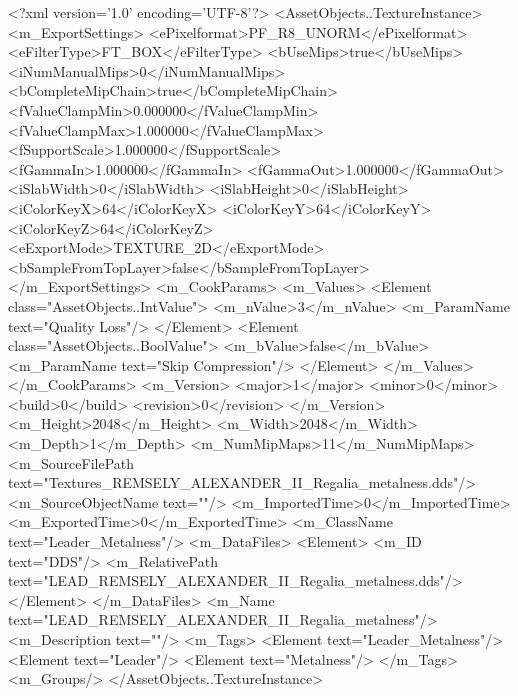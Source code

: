 <?xml version='1.0' encoding='UTF-8'?>
<AssetObjects..TextureInstance>
  <m_ExportSettings>
    <ePixelformat>PF_R8_UNORM</ePixelformat>
    <eFilterType>FT_BOX</eFilterType>
    <bUseMips>true</bUseMips>
    <iNumManualMips>0</iNumManualMips>
    <bCompleteMipChain>true</bCompleteMipChain>
    <fValueClampMin>0.000000</fValueClampMin>
    <fValueClampMax>1.000000</fValueClampMax>
    <fSupportScale>1.000000</fSupportScale>
    <fGammaIn>1.000000</fGammaIn>
    <fGammaOut>1.000000</fGammaOut>
    <iSlabWidth>0</iSlabWidth>
    <iSlabHeight>0</iSlabHeight>
    <iColorKeyX>64</iColorKeyX>
    <iColorKeyY>64</iColorKeyY>
    <iColorKeyZ>64</iColorKeyZ>
    <eExportMode>TEXTURE_2D</eExportMode>
    <bSampleFromTopLayer>false</bSampleFromTopLayer>
  </m_ExportSettings>
  <m_CookParams>
    <m_Values>
      <Element class="AssetObjects..IntValue">
        <m_nValue>3</m_nValue>
        <m_ParamName text="Quality Loss"/>
      </Element>
      <Element class="AssetObjects..BoolValue">
        <m_bValue>false</m_bValue>
        <m_ParamName text="Skip Compression"/>
      </Element>
    </m_Values>
  </m_CookParams>
  <m_Version>
    <major>1</major>
    <minor>0</minor>
    <build>0</build>
    <revision>0</revision>
  </m_Version>
  <m_Height>2048</m_Height>
  <m_Width>2048</m_Width>
  <m_Depth>1</m_Depth>
  <m_NumMipMaps>11</m_NumMipMaps>
  <m_SourceFilePath text="Textures\LEAD_REMSELY_ALEXANDER_II_Regalia_metalness.dds"/>
  <m_SourceObjectName text=""/>
  <m_ImportedTime>0</m_ImportedTime>
  <m_ExportedTime>0</m_ExportedTime>
  <m_ClassName text="Leader_Metalness"/>
  <m_DataFiles>
    <Element>
      <m_ID text="DDS"/>
      <m_RelativePath text="LEAD_REMSELY_ALEXANDER_II_Regalia_metalness.dds"/>
    </Element>
  </m_DataFiles>
  <m_Name text="LEAD_REMSELY_ALEXANDER_II_Regalia_metalness"/>
  <m_Description text=""/>
  <m_Tags>
    <Element text="Leader_Metalness"/>
    <Element text="Leader"/>
    <Element text="Metalness"/>
  </m_Tags>
  <m_Groups/>
</AssetObjects..TextureInstance>
